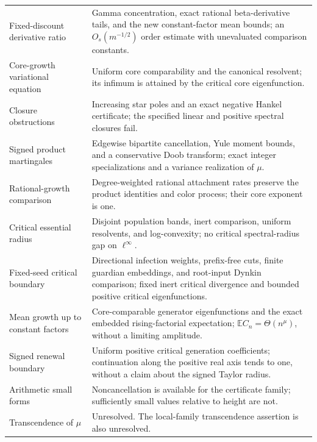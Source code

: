 \documentclass[11pt]{article}
\theoremstyle{remark}
\begin{document}
{\begin{longtable}{p{}p{}}
Fixed-discount derivative ratio & Gamma concentration, exact rational beta-derivative tails, and the new constant-factor mean bounds; an $O_s(m^{-1/2})$ order estimate with unevaluated comparison constants.\\
Core-growth variational equation & Uniform core comparability and the canonical resolvent; its infimum is attained by the critical core eigenfunction.\\
Closure obstructions & Increasing star poles and an exact negative Hankel certificate; the specified linear and positive spectral closures fail.\\
Signed product martingales & Edgewise bipartite cancellation, Yule moment bounds, and a conservative Doob transform; exact integer specializations and a variance realization of $\mu$.\\
Rational-growth comparison & Degree-weighted rational attachment rates preserve the product identities and color process; their core exponent is one.\\
Critical essential radius & Disjoint population bands, inert comparison, uniform resolvents, and log-convexity; no critical spectral-radius gap on $\ell^\infty$.\\
Fixed-seed critical boundary & Directional infection weights, prefix-free cuts, finite guardian embeddings, and root-input Dynkin comparison; fixed inert critical divergence and bounded positive critical eigenfunctions.\\
Mean growth up to constant factors & Core-comparable generator eigenfunctions and the exact embedded rising-factorial expectation; $\mathbb E C_n=\Theta(n^\mu)$, without a limiting amplitude.\\
Signed renewal boundary & Uniform positive critical generation coefficients; continuation along the positive real axis tends to one, without a claim about the signed Taylor radius.\\
Arithmetic small forms & Noncancellation is available for the certificate family; sufficiently small values relative to height are not.\\
Transcendence of $\mu$ & Unresolved. The local-family transcendence assertion is also unresolved.\\
\bottomrule
\end{longtable}}
\end{document}

